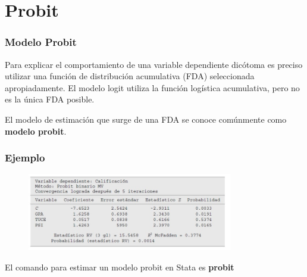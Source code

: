 \documentclass[10pt]{beamer}
\begin{document}




\section{Probit}
\begin{frame}
\frametitle{Modelo Probit}

Para explicar el comportamiento de una variable dependiente dicótoma es
preciso utilizar una función de distribución acumulativa (FDA) seleccionada apropiadamente. El modelo logit utiliza la función logística acumulativa, pero no es la única FDA posible.

\vspace{4mm}

El modelo de estimación que surge de una FDA  se conoce comúnmente como \textbf{modelo probit}.

\end{frame}



\begin{frame}
\frametitle{Ejemplo}

\begin{figure}
\begin{center}
    \includegraphics[width=0.8\textwidth]{9_7.JPG}
\end{center}
\end{figure}


El comando para estimar un modelo probit en Stata es \textbf{probit}


\end{frame}

\end{document}
